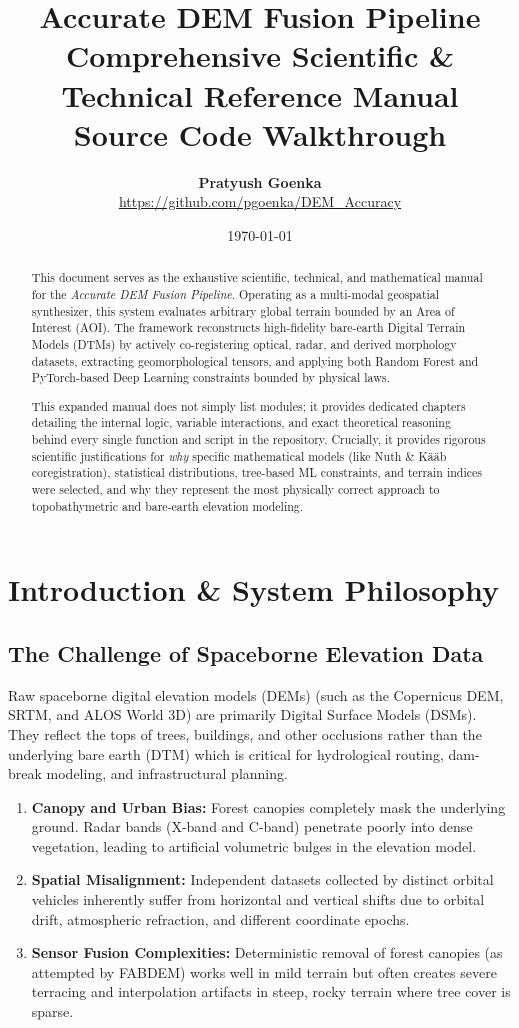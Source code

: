 \documentclass[11pt,a4paper,oneside]{report}
\title{\Huge \textbf{Accurate DEM Fusion Pipeline} \\ \vspace{0.5cm} \Large Comprehensive Scientific \& Technical Reference Manual \\ \large Source Code Walkthrough}
\author{\textbf{Pratyush Goenka}\\
\small\url{https://github.com/pgoenka/DEM_Accuracy}}
\date{\today}
\begin{document}
\maketitle

\begin{abstract}
This document serves as the exhaustive scientific, technical, and mathematical manual for the \textit{Accurate DEM Fusion Pipeline}. Operating as a multi-modal geospatial synthesizer, this system evaluates arbitrary global terrain bounded by an Area of Interest (AOI). The framework reconstructs high-fidelity bare-earth Digital Terrain Models (DTMs) by actively co-registering optical, radar, and derived morphology datasets, extracting geomorphological tensors, and applying both Random Forest and PyTorch-based Deep Learning constraints bounded by physical laws.

This expanded manual does not simply list modules; it provides dedicated chapters detailing the internal logic, variable interactions, and exact theoretical reasoning behind every single function and script in the repository. Crucially, it provides rigorous scientific justifications for \textit{why} specific mathematical models (like Nuth \& K\"a\"ab coregistration), statistical distributions, tree-based ML constraints, and terrain indices were selected, and why they represent the most physically correct approach to topobathymetric and bare-earth elevation modeling.
\end{abstract}

\chapter{Introduction \& System Philosophy}

\section{The Challenge of Spaceborne Elevation Data}
Raw spaceborne digital elevation models (DEMs) (such as the Copernicus DEM, SRTM, and ALOS World 3D) are primarily Digital Surface Models (DSMs). They reflect the tops of trees, buildings, and other occlusions rather than the underlying bare earth (DTM) which is critical for hydrological routing, dam-break modeling, and infrastructural planning.
\begin{enumerate}
    \item \textbf{Canopy and Urban Bias:} Forest canopies completely mask the underlying ground. Radar bands (X-band and C-band) penetrate poorly into dense vegetation, leading to artificial volumetric bulges in the elevation model.
    \item \textbf{Spatial Misalignment:} Independent datasets collected by distinct orbital vehicles inherently suffer from horizontal and vertical shifts due to orbital drift, atmospheric refraction, and different coordinate epochs.
    \item \textbf{Sensor Fusion Complexities:} Deterministic removal of forest canopies (as attempted by FABDEM) works well in mild terrain but often creates severe terracing and interpolation artifacts in steep, rocky terrain where tree cover is sparse.
\end{enumerate}
\end{document}
